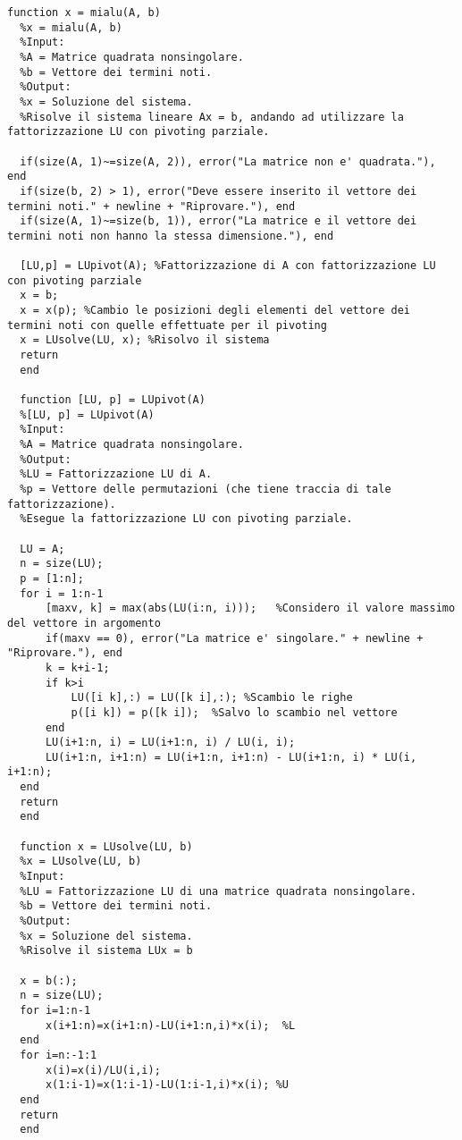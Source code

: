 \documentclass[10pt,a4paper]{article}
\begin{document}
\begin{lstlisting}[style=Matlab-editor]
  function x = mialu(A, b)
  %x = mialu(A, b)
  %Input:
  %A = Matrice quadrata nonsingolare.
  %b = Vettore dei termini noti.
  %Output:
  %x = Soluzione del sistema.
  %Risolve il sistema lineare Ax = b, andando ad utilizzare la fattorizzazione LU con pivoting parziale.
  
  if(size(A, 1)~=size(A, 2)), error("La matrice non e' quadrata."), end
  if(size(b, 2) > 1), error("Deve essere inserito il vettore dei termini noti." + newline + "Riprovare."), end
  if(size(A, 1)~=size(b, 1)), error("La matrice e il vettore dei termini noti non hanno la stessa dimensione."), end
  
  [LU,p] = LUpivot(A); %Fattorizzazione di A con fattorizzazione LU con pivoting parziale
  x = b;
  x = x(p); %Cambio le posizioni degli elementi del vettore dei termini noti con quelle effettuate per il pivoting
  x = LUsolve(LU, x); %Risolvo il sistema
  return
  end
  
  function [LU, p] = LUpivot(A)
  %[LU, p] = LUpivot(A)
  %Input:
  %A = Matrice quadrata nonsingolare.
  %Output:
  %LU = Fattorizzazione LU di A.
  %p = Vettore delle permutazioni (che tiene traccia di tale fattorizzazione).
  %Esegue la fattorizzazione LU con pivoting parziale.
  
  LU = A;
  n = size(LU);
  p = [1:n];
  for i = 1:n-1
      [maxv, k] = max(abs(LU(i:n, i)));   %Considero il valore massimo del vettore in argomento
      if(maxv == 0), error("La matrice e' singolare." + newline + "Riprovare."), end
      k = k+i-1;
      if k>i
          LU([i k],:) = LU([k i],:); %Scambio le righe 
          p([i k]) = p([k i]);  %Salvo lo scambio nel vettore
      end
      LU(i+1:n, i) = LU(i+1:n, i) / LU(i, i);
      LU(i+1:n, i+1:n) = LU(i+1:n, i+1:n) - LU(i+1:n, i) * LU(i, i+1:n);
  end
  return
  end
  
  function x = LUsolve(LU, b)
  %x = LUsolve(LU, b)
  %Input:
  %LU = Fattorizzazione LU di una matrice quadrata nonsingolare.
  %b = Vettore dei termini noti.
  %Output:
  %x = Soluzione del sistema.
  %Risolve il sistema LUx = b
  
  x = b(:);
  n = size(LU);
  for i=1:n-1
      x(i+1:n)=x(i+1:n)-LU(i+1:n,i)*x(i);  %L
  end
  for i=n:-1:1
      x(i)=x(i)/LU(i,i);
      x(1:i-1)=x(1:i-1)-LU(1:i-1,i)*x(i); %U
  end
  return
  end
\end{lstlisting}
\end{document}
